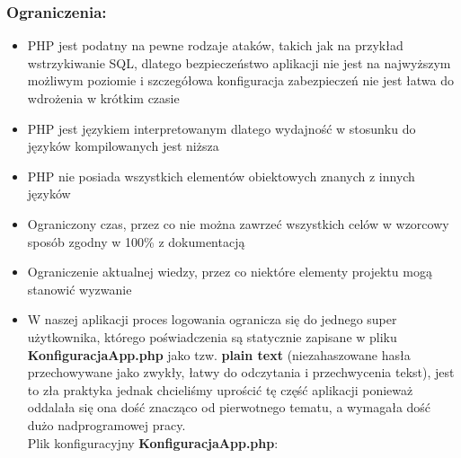 \subsubsection{Ograniczenia:}
    \begin{itemize}
        \item PHP jest podatny na pewne rodzaje ataków, takich jak na przykład wstrzykiwanie SQL, dlatego bezpieczeństwo aplikacji nie jest na najwyższym możliwym poziomie i szczegółowa konfiguracja zabezpieczeń nie jest łatwa do wdrożenia w krótkim czasie
        \item PHP jest językiem interpretowanym dlatego wydajność w stosunku do języków kompilowanych jest niższa
        \item PHP nie posiada wszystkich elementów obiektowych znanych z innych języków
        \item Ograniczony czas, przez co nie można zawrzeć wszystkich celów w wzorcowy sposób zgodny w 100\% z dokumentacją
        \item Ograniczenie aktualnej wiedzy, przez co niektóre elementy projektu mogą stanowić wyzwanie
        \item W naszej aplikacji proces logowania ogranicza się do jednego super użytkownika, którego poświadczenia są statycznie zapisane w pliku \textbf{KonfiguracjaApp.php} jako tzw. \textbf{plain text} (niezahaszowane hasła przechowywane jako zwykły, łatwy do odczytania i przechwycenia tekst), jest to zła praktyka jednak chcieliśmy uprościć tę część aplikacji ponieważ oddalała się ona dość znacząco od pierwotnego tematu, a wymagała dość dużo nadprogramowej pracy.\\
        Plik konfiguracyjny \textbf{KonfiguracjaApp.php}:
         
        
    \end{itemize}

\pagebreak

